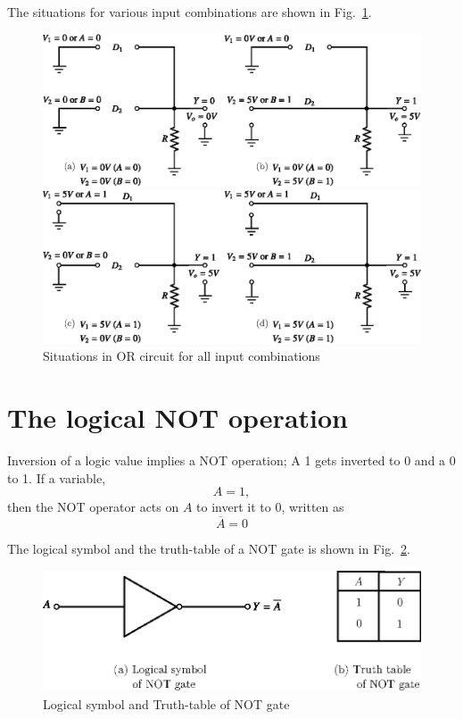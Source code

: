 The situations for various input combinations are shown in Fig.~\ref{fig6.11}.
\begin{figure}[H]
\centering
\includegraphics{chap6/fig85_6.11ab.eps}

\bigskip
\medskip

\includegraphics{chap6/fig85_6.11cd.eps}
\bigskip
\caption{Situations in OR circuit for all input combinations}\label{fig6.11}
\end{figure}

\section{The logical NOT operation}\label{sec6.19}

Inversion of a logic value implies a NOT operation; A 1 gets inverted to 0 and a 0 to 1. If a variable,
$$
A=1,
$$
then the NOT operator acts on $A$ to invert it to 0, written as
$$
\overline{A}=0
$$

The logical symbol and the truth-table of a NOT gate is shown in Fig.~\ref{fig6.12}.
\begin{figure}[H]
\centering
\includegraphics{chap6/fig86_6.12a.eps}
\caption{Logical symbol and Truth-table of NOT gate}\label{fig6.12}
\end{figure}

